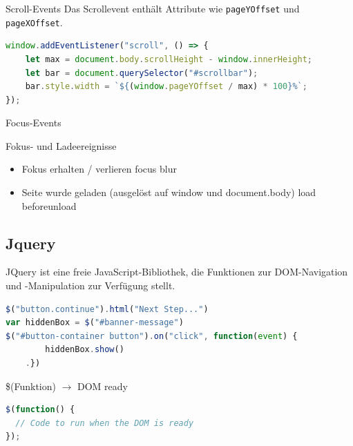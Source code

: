 \begin{definition}{Scroll-Events}
Das Scrollevent enthält Attribute wie \texttt{pageYOffset} und \texttt{pageXOffset}.
\begin{lstlisting}[language=JavaScript, style=basesmol]
window.addEventListener("scroll", () => {
    let max = document.body.scrollHeight - window.innerHeight;
    let bar = document.querySelector("#scrollbar");
    bar.style.width = `${(window.pageYOffset / max) * 100}%`;
});
\end{lstlisting}
\end{definition}

\begin{definition}{Focus-Events}

Fokus- und Ladeereignisse
\begin{itemize}
  \item Fokus erhalten / verlieren
  \subitem focus
  \subitem blur
  \item Seite wurde geladen (ausgelöst auf window und document.body)
  \subitem load
  \subitem beforeunload
\end{itemize}
\end{definition}

\subsection{Jquery}
JQuery ist eine freie JavaScript-Bibliothek, die Funktionen zur DOM-Navigation und -Manipulation zur Verfügung stellt.

\begin{lstlisting}[language=JavaScript, style=basesmol]
$("button.continue").html("Next Step...")
var hiddenBox = $("#banner-message")
$("#button-container button").on("click", function(event) {
        hiddenBox.show()
    .})
\end{lstlisting}

\begin{definition}{\$(Funktion)} $\rightarrow$ DOM ready\\
\begin{lstlisting}[language=JavaScript, style=basesmol]
$(function() { 
  // Code to run when the DOM is ready
});
\end{lstlisting}
\end{definition}

